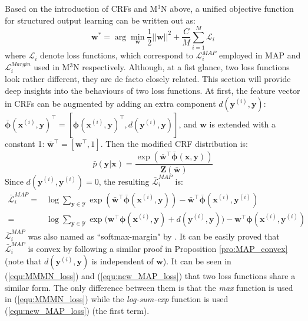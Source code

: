 Based on the introduction of CRFs and M$^3$N above, a unified objective function for structured output learning  can be written out as:  
\begin{equation} 
        \mathbf{w}^* = \arg\min_{\mathbf{w}} \frac{1}{2} ||\mathbf{w}||^2+  \frac{C}{M}\sum_{i=1}^M \mathcal{L}_i 
    \label{equ:unify}
\end{equation} 
where $\mathcal{L}_i$ denote loss functions, which correspond to $\mathcal{L}^{MAP}_i$  employed in MAP and $\mathcal{L}^{Margin}_i$ used 
in M$^3$N respectively.      
Although, at a fist glance, two loss functions look rather different, they are de facto closely related. This section will provide deep insights  
into the behaviours of two loss functions.  
At first, the feature vector in CRFs can be augmented by adding an extra component $d(\mathbf{y}^{(i)},\mathbf{y})$:  
$\bar{\boldsymbol{\phi}}(\mathbf{x}^{(i)},\mathbf{y})^\top=[\boldsymbol{\phi}(\mathbf{x}^{(i)},\mathbf{y})^\top,d(\mathbf{y}^{(i)},\mathbf{y})]$, 
and $\mathbf{w}$ is extended with a constant 1: $\bar{\mathbf{w}}^\top=[\mathbf{w}^\top, 1]$. Then the modified CRF distribution is:
\begin{equation}
    \bar{p}(\mathbf{y}|\mathbf{x})=\frac{\exp(\bar{\mathbf{w}}^\top \bar{\boldsymbol{\phi}}(\mathbf{x,y}))}{\mathbf{Z(\bar{w})}}
\end{equation}
Since $d(\mathbf{y}^{(i)},\mathbf{y}^{(i)})=0$, the resulting $\bar{\mathcal{L}}^{MAP}_i$ is:
\begin{equation}
    \begin{array}{cl}
        \bar{\mathcal{L}}^{MAP}_i      =&\log \sum_{\mathbf{y}\in\mathcal{Y}} \exp(\bar{\mathbf{w}}^\top \bar{\boldsymbol{\phi}}(\mathbf{x}^{(i)},\mathbf{y}))-\bar{\mathbf{w}}^\top \bar{\boldsymbol{\phi}}(\mathbf{x}^{(i)},\mathbf{y}^{(i)}) \\ 
                                       =&\log \sum_{\mathbf{y}\in\mathcal{Y}} \exp\big(\mathbf{w}^\top \boldsymbol{\phi}(\mathbf{x}^{(i)},\mathbf{y})+d(\mathbf{y}^{(i)},\mathbf{y})\big) -\mathbf{w}^\top \boldsymbol{\phi}(\mathbf{x}^{(i)},\mathbf{y}^{(i)}) 
\end{array}
    \label{equ:new_MAP_loss}
\end{equation}
$\bar{\mathcal{L}}^{MAP}_i$ was also named as ``softmax-margin" by \cite{SoftMax}. It can be easily proved that $\bar{\mathcal{L}}^{MAP}_i$ is convex by following a similar proof in {Proposition \ref{pro:MAP_convex}}
(note that $d(\mathbf{y}^{(i)},\mathbf{y})$ is independent of $\mathbf{w}$). It can be seen in (\ref{equ:MMMN_loss}) and (\ref{equ:new_MAP_loss}) that two loss functions share a similar form. The only 
difference between them is that the \emph{max} function is used in (\ref{equ:MMMN_loss}) while the \emph{log-sum-exp} function is used (\ref{equ:new_MAP_loss}) (the first term). 

